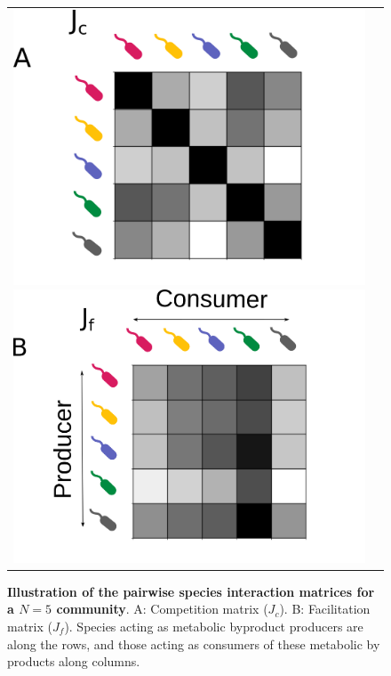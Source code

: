 \documentclass[11pt, a4paper]{article}
\begin{document}
\begin{spacing}{1.5}
\begin{figure}
    \centering
    \begin{tabular}{c@{}c@{}}
    \includegraphics[scale=0.45]{./Figures/Jc.png}
    \includegraphics[scale=0.45]{./Figures/Jf.png}
    \end{tabular}
    \caption{\textbf{Illustration of the pairwise species interaction matrices for a $N=5$ community}. A: Competition matrix ($J_c$). B: Facilitation matrix ($J_f$). Species acting as metabolic byproduct producers are along the rows, and those acting as consumers of these metabolic by products along columns. }
    \label{fig:J}
\end{figure}


\end{spacing}
\end{document}
